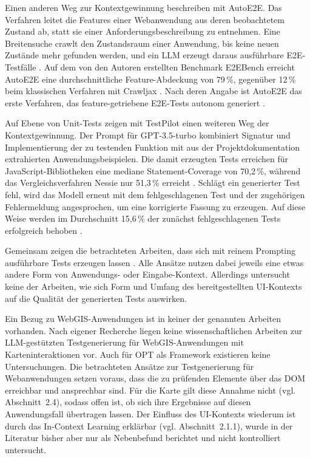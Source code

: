 Einen anderen Weg zur Kontextgewinnung beschreiben \textcite{alian_feature-driven_2024} mit AutoE2E. Das Verfahren leitet die Features einer Webanwendung aus deren beobachtetem Zustand ab, statt sie einer Anforderungsbeschreibung zu entnehmen. Eine Breitensuche crawlt den Zustandsraum einer Anwendung, bis keine neuen Zustände mehr gefunden werden, und ein \ac{LLM} erzeugt daraus ausführbare \ac{E2E}-Testfälle \parencite[S.~6]{alian_feature-driven_2024}. Auf dem von den Autoren erstellten Benchmark E2EBench erreicht AutoE2E eine durchschnittliche Feature-Abdeckung von 79\,\%, gegenüber 12\,\% beim klassischen Verfahren mit Crawljax \parencite[S.~9]{alian_feature-driven_2024}. Nach deren Angabe ist AutoE2E das erste Verfahren, das feature-getriebene \ac{E2E}-Tests autonom generiert \parencite[S.~1]{alian_feature-driven_2024}.

Auf Ebene von Unit-Tests zeigen \textcite{schafer_empirical_2023} mit TestPilot einen weiteren Weg der Kontextgewinnung. Der Prompt für GPT-3.5-turbo kombiniert Signatur und Implementierung der zu testenden Funktion mit aus der Projektdokumentation extrahierten Anwendungsbeispielen. Die damit erzeugten Tests erreichen für JavaScript-Bibliotheken eine mediane Statement-Coverage von 70,2\,\%, während das Vergleichsverfahren Nessie nur 51,3\,\% erreicht \parencite[S.~1]{schafer_empirical_2023}. Schlägt ein generierter Test fehl, wird das Modell erneut mit dem fehlgeschlagenen Test und der zugehörigen Fehlermeldung angesprochen, um eine korrigierte Fassung zu erzeugen. Auf diese Weise werden im Durchschnitt 15,6\,\% der zunächst fehlgeschlagenen Tests erfolgreich behoben \parencite[S.~2]{schafer_empirical_2023}.

Gemeinsam zeigen die betrachteten Arbeiten, dass sich mit reinem Prompting ausführbare Tests erzeugen lassen \parencite{plein_automatic_2023,ferreira_acceptance_2025,alian_feature-driven_2024,schafer_empirical_2023}. Alle Ansätze nutzen dabei jeweils eine etwas andere Form von Anwendungs- oder Eingabe-Kontext. Allerdings untersucht keine der Arbeiten, wie sich Form und Umfang des bereitgestellten \ac{UI}-Kontexts auf die Qualität der generierten Tests auswirken.

Ein Bezug zu WebGIS-Anwendungen ist in keiner der genannten Arbeiten vorhanden. Nach eigener Recherche liegen keine wissenschaftlichen Arbeiten zur \ac{LLM}-gestützten Testgenerierung für WebGIS-Anwendungen mit Karteninteraktionen vor. Auch für \ac{OPT} als Framework existieren keine Untersuchungen. Die betrachteten Ansätze zur Testgenerierung für Webanwendungen setzen voraus, dass die zu prüfenden Elemente über das \ac{DOM} erreichbar und ansprechbar sind. Für die Karte gilt diese Annahme nicht (vgl. Abschnitt~2.4), sodass offen ist, ob sich ihre Ergebnisse auf diesen Anwendungsfall übertragen lassen. Der Einfluss des \ac{UI}-Kontexts wiederum ist durch das In-Context Learning erklärbar (vgl. Abschnitt~2.1.1), wurde in der Literatur bisher aber nur als Nebenbefund berichtet und nicht kontrolliert untersucht.

